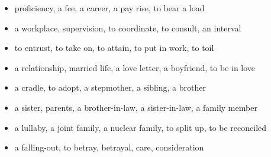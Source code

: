 \begin{itemize}
\raggedright
  \item proficiency, a fee, a career, a pay rise, to bear a load
  \item a workplace, supervision, to coordinate, to consult, an interval
  \item to entrust, to take on, to attain, to put in work, to toil
  \item a relationship, married life, a love letter, a boyfriend, to be in love
  \item a cradle, to adopt, a stepmother, a sibling, a brother
  \item a sister, parents, a brother-in-law, a sister-in-law, a family member
  \item a lullaby, a joint family, a nuclear family, to split up, to be reconciled
  \item a falling-out, to betray, betrayal, care, consideration
\end{itemize}

